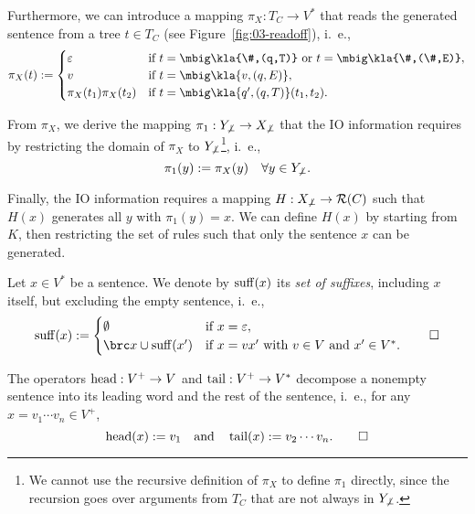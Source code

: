\label{def:03-def-pi-x}
Furthermore, we can introduce a mapping $\pi_X: T_C \to V^*$ that reads the
generated sentence from a tree $t\in T_C$ (see Figure~\ref{fig:03-readoff}),
i.~e.,
\label{eq:03-pi_X}\[
 \pi_X(t) := \begin{cases}
  \eps & \text{if } t = \mbig\kla{\#,(q,T)} \text{ or } t = \mbig\kla{\#,(\#,E)}, \\
  v    & \text{if } t = \mbig\kla{v,(q,E)}, \\
  \pi_X(t_1)\pi_X(t_2) & \text{if } t = \mbig\kla{q',(q,T)}(t_1,t_2).
 \end{cases}
\]

From $\pi_X$, we derive the mapping $\pi_1: Y_{\not\bot} \to X_{\not\bot}$ that
the IO information requires by restricting the domain of $\pi_X$ to
$Y_{\not\bot}$\footnote{We cannot use the recursive definition of $\pi_X$ to
define $\pi_1$ directly, since the recursion goes over arguments from $T_C$
that are not always in $Y_{\not\bot}$.}, i.~e.,
\[
 \pi_1(y) := \pi_X(y) \quad\forall y\in Y_{\not\bot}.
\]

Finally, the IO information requires a mapping $H: X_{\not\bot}\to\mathcal R(C)$ such
that $H(x)$ generates all $y$ with $\pi_1(y)=x$. We can define $H(x)$ by
starting from $K$, then restricting the set of rules such that only the
sentence $x$ can be generated.

\begin{definition}
 Let $x\in V^*$ be a sentence. We denote by $\operatorname{suff}(x)$ its
 \emph{set of suffixes}, including $x$ itself, but excluding the empty sentence, i.~e.,
 \[
  \suff(x) := \begin{cases}
   \emptyset & \text{if } x = \eps, \\
   \brc x \cup \suff(x') & \text{if } x = vx' \text{ with } v\in V\text{ and }x'\in V^*.
  \end{cases}\qedhere
 \]
\end{definition}

\begin{definition}
 The operators $\operatorname{head}:V^+\to V$ and $\operatorname{tail}:V^+\to V^*$ decompose a nonempty sentence into its leading word and the rest of the sentence, i.~e., for any $x = v_1\cdots v_n\in V^+$,
 \[
  \operatorname{head}(x) := v_1
  \quad\text{and}\quad
  \operatorname{tail}(x) := v_2\cdots v_n.
  \qedhere
 \]
\end{definition}

